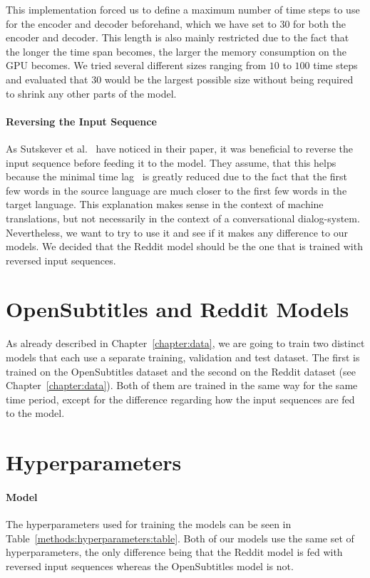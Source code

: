 This implementation forced us to define a maximum number of time steps to use for the encoder and decoder beforehand, which we have set to $30$ for both the encoder and decoder. This length is also mainly restricted due to the fact that the longer the time span becomes, the larger the memory consumption on the GPU becomes. We tried several different sizes ranging from $10$ to $100$ time steps and evaluated that $30$ would be the largest possible size without being required to shrink any other parts of the model.

\paragraph{Reversing the Input Sequence} As Sutskever et al.~\cite{Sutskever:2014} have noticed in their paper, it was beneficial to reverse the input sequence before feeding it to the model. They assume, that this helps because the minimal time lag~\cite{Hochreiter:1997} is greatly reduced due to the fact that the first few words in the source language are much closer to the first few words in the target language. This explanation makes sense in the context of machine translations, but not necessarily in the context of a conversational dialog-system. Nevertheless, we want to try to use it and see if it makes any difference to our models. We decided that the Reddit model should be the one that is trained with reversed input sequences.

\section{OpenSubtitles and Reddit Models}
\label{methods:both_models}
As already described in Chapter~\ref{chapter:data}, we are going to train two distinct models that each use a separate training, validation and test dataset. The first is trained on the OpenSubtitles dataset and the second on the Reddit dataset (see Chapter~\ref{chapter:data}). Both of them are trained in the same way for the same time period, except for the difference regarding how the input sequences are fed to the model.

\section{Hyperparameters}
\label{methods:hyperparameters}

\paragraph{Model} The hyperparameters used for training the models can be seen in Table~\ref{methods:hyperparameters:table}. Both of our models use the same set of hyperparameters, the only difference being that the Reddit model is fed with reversed input sequences whereas the OpenSubtitles model is not.

